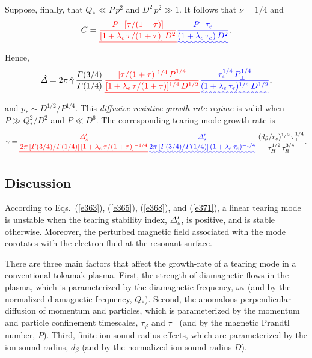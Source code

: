 \documentclass[12pt,prb,aps]{revtex4-1}
\providecommand{\DIFadd}[1]{{\protect\color{blue}\uwave{#1}}} %
\providecommand{\DIFdel}[1]{{\protect\color{red}\sout{#1}}}                      %
\providecommand{\DIFaddbegin}{} %
\providecommand{\DIFaddend}{} %
\providecommand{\DIFdelbegin}{} %
\providecommand{\DIFdelend}{} %
\begin{document}
Suppose, finally, that $Q_\ast \ll P\,p^2$ and $D^2\,p^2\gg 1$. It follows that $\nu=1/4$ and
\begin{equation}
C = \DIFdelbegin \DIFdel{\frac{P_\perp\,[\tau/(1+\tau)]}{[1+\lambda_e\,\tau/(1+\tau)]\,D^2}}\DIFdelend \DIFaddbegin \DIFadd{\frac{P_\perp\,\tau_e}{(1+\lambda_e\,\tau_e)\,D^2}}\DIFaddend .
\end{equation} 
Hence,
\begin{equation} 
\hat{\mit\Delta} = 2\pi\,\hat{\gamma}\,\frac{{\mit\Gamma}(3/4)}{{\mit\Gamma}(1/4)}\,\DIFdelbegin \DIFdel{\frac{[\tau/(1+\tau)]^{1/4}\,P_\perp^{1/4}}{[1+\lambda_e\,\tau/(1+\tau)]^{1/4}\,D^{1/2}}}\DIFdelend \DIFaddbegin \DIFadd{\frac{\tau_e^{1/4}\,P_\perp^{1/4}}{(1+\lambda_e\,\tau_e)^{1/4}\,D^{1/2}}}\DIFaddend ,
\end{equation}
and $p_\ast \sim D^{1/2}/P^{1/4}$. This {\em diffusive-resistive growth-rate regime}\/ is valid when $P\gg Q_\ast^2/D^2$ and
$P\ll D^6$. The corresponding tearing mode growth-rate is 
\begin{equation}\label{e371}
\gamma= \DIFdelbegin \DIFdel{\frac{{\mit\Delta}_s'}{2\pi\,[{\mit\Gamma}(3/4)/{\mit\Gamma}(1/4)]\,[1+\lambda_e\,\tau/(1+\tau)]^{-1/4}}}\DIFdelend \DIFaddbegin \DIFadd{\frac{{\mit\Delta}_s'}{2\pi\,[{\mit\Gamma}(3/4)/{\mit\Gamma}(1/4)]\,(1+\lambda_e\,\tau_e)^{-1/4}}}\DIFaddend \,\frac{(d_\beta/r_s)^{1/2}\,\tau_\perp^{1/4}}{\tau_H^{1/2}\,\tau_R^{3/4}}.
\end{equation}

\subsection{Discussion}
According to Eqs.~(\ref{e363}), (\ref{e365}), (\ref{e368}), and (\ref{e371}), a linear tearing mode is unstable when the tearing stability index, ${\mit\Delta}_s'$, is positive, and is stable otherwise.\cite{fkr}
Moreover, the perturbed magnetic field associated with the mode corotates with the electron fluid at the resonant surface.\cite{ara} 

There are three main factors that
affect the growth-rate of a tearing mode in a conventional tokamak plasma. First, the strength of diamagnetic flows in the plasma, which is parameterized by the
diamagnetic frequency, $\omega_\ast$ (and by the normalized diamagnetic frequency, $Q_\ast$). Second, the  anomalous perpendicular diffusion of momentum and particles, which is parameterized by the momentum and particle confinement
timescales, $\tau_\varphi$ and $\tau_\perp$ (and by the magnetic Prandtl number, $P$). Third, finite ion sound radius effects,  which are parameterized by the ion sound radius, $d_\beta$ (and by the normalized ion 
sound radius $D$).
\end{document}
